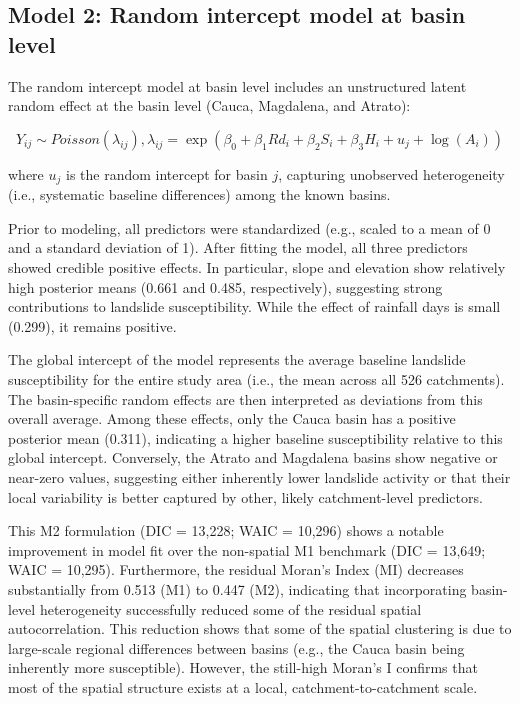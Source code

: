\documentclass[journal abbreviation, manuscript]{copernicus}
\begin{document}
\subsection{Model 2: Random intercept model at basin level}\label{subsec42}

The random intercept model at basin level includes an unstructured latent random effect at the basin level (Cauca, Magdalena, and Atrato):

\begin{equation}
Y_{ij} \sim Poisson(\lambda_{ij}), \lambda_{ij} = \exp(\beta_0 + \beta_1 Rd_{i} + \beta_2 S_i + \beta_3 H_i + u_j + \log(A_i))
\end{equation}

where $u_j$ is the random intercept for basin $j$, capturing unobserved heterogeneity (i.e., systematic baseline differences) among the known basins.

Prior to modeling, all predictors were standardized (e.g., scaled to a mean of 0 and a standard deviation of 1). After fitting the model, all three predictors showed credible positive effects. In particular, slope and elevation show relatively high posterior means (0.661 and 0.485, respectively), suggesting strong contributions to landslide susceptibility. While the effect of rainfall days is small (0.299), it remains positive.

The global intercept of the model represents the average baseline landslide susceptibility for the entire study area (i.e., the mean across all 526 catchments). The basin-specific random effects are then interpreted as deviations from this overall average. Among these effects, only the Cauca basin has a positive posterior mean (0.311), indicating a higher baseline susceptibility relative to this global intercept. Conversely, the Atrato and Magdalena basins show negative or near-zero values, suggesting either inherently lower landslide activity or that their local variability is better captured by other, likely catchment-level predictors.

This M2 formulation (DIC = 13,228; WAIC = 10,296) shows a notable improvement in model fit over the non-spatial M1 benchmark (DIC = 13,649; WAIC = 10,295). Furthermore, the residual Moran’s Index (MI) decreases substantially from 0.513 (M1) to 0.447 (M2), indicating that incorporating basin-level heterogeneity successfully reduced some of the residual spatial autocorrelation. This reduction shows that some of the spatial clustering is due to large-scale regional differences between basins (e.g., the Cauca basin being inherently more susceptible). However, the still-high Moran’s I confirms that most of the spatial structure exists at a local, catchment-to-catchment scale.
\end{document}
